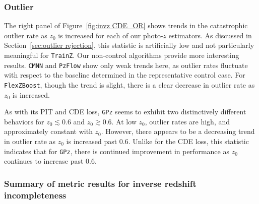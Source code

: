 \documentclass[fleqn,usenatbib,useAMS]{mnras}
\newcommand{\PersonalTag}[3]{{\color{#2}{$^{#1}$ [#3}]}}
\newcommand{\aim}[1]{\PersonalTag{Alex}{violet}{#1}}
\newcommand{\revone}[2]{{\color{black}{#2}}}
\newcommand{\code}[1]{\texttt{#1}\xspace}
\newcommand{\gpz}{\code{GPz}}
\begin{document}
\subsubsection{Outlier \revone{Rejection}{Identification}}

The right panel of Figure~\ref{fig:invz CDE_OR} shows trends in the catastrophic outlier rate as $z_0$ is increased for each of our photo-$z$ estimators. As discussed in Section~\ref{sec:outlier rejection}, this statistic is artificially low and not particularly meaningful for \texttt{TrainZ}. Our non-control algorithms provide more interesting results. \texttt{CMNN} and \texttt{PzFlow} show only weak trends here, as outlier rates fluctuate with respect to the baseline determined in the representative control case. For \texttt{FlexZBoost}, though the trend is slight, there is a clear decrease in outlier rate as $z_0$ is increased. 

As with its PIT and CDE loss, \texttt{GPz} seems to exhibit two distinctively different behaviors for $z_0\lesssim 0.6$ and $z_0 \gtrsim 0.6$. At low $z_0$, outlier rates are high, and approximately constant with $z_0$. However, there appears to be a decreasing trend in outlier rate as $z_0$ is increased past $0.6$. Unlike for the CDE loss, this statistic indicates that for \texttt{GPz}, there is continued improvement in performance as $z_0$ continues to increase past $0.6$. 


\subsubsection{Summary of metric results for inverse redshift incompleteness}
\end{document}
